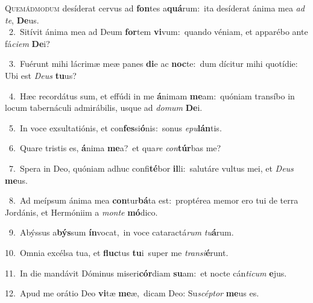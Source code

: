 \lettrine{\initial\textcolor{\initialcolor}{Q}}{uemádmodum} desíderat cervus ad \textbf{fon}\-tes a\-\textbf{quá}\-rum:~\star ita desíderat ánima mea \textit{ad} \textit{te}\-, \textbf{De}\-us.\\
{\numbfont\textcolor{\numbcolor}{~2.}}~Sitívit ánima mea ad Deum \textbf{for}\-tem \textbf{vi}\-vum:~\star quando véniam, et apparébo ante fá\-\textit{ci}\-\textit{em} \textbf{De}\-i?\par
{\numbfont\textcolor{\numbcolor}{~3.}}~Fuérunt mihi lácrimæ meæ panes \textbf{di}\-e ac \textbf{noc}\-te:~\star dum dícitur mihi quotídie: Ubi est \textit{De}\-\textit{us} \textbf{tu}\-us?\par
{\numbfont\textcolor{\numbcolor}{~4.}}~Hæc recordátus sum, et effúdi in me \textbf{á}\-nimam \textbf{me}\-am:~\star quóniam transíbo in locum tabernáculi admirábilis, usque ad \textit{do}\-\textit{mum} \textbf{De}\-i.\par
{\numbfont\textcolor{\numbcolor}{~5.}}~In voce exsultatiónis, et con\-\textbf{fes}\-si\-\textbf{ó}\-nis:~\star sonus \textit{e}\-\textit{pu}\textbf{lán}tis.\par
{\numbfont\textcolor{\numbcolor}{~6.}}~Quare tristis es, \textbf{á}\-nima \textbf{me}\-a?~\star et qua\textit{re} \textit{con}\-\textbf{túr}bas me?\par
{\numbfont\textcolor{\numbcolor}{~7.}}~Spera in Deo, quóniam adhuc confi\-\textbf{té}\-bor \textbf{il}\-li:~\star salutáre vultus mei, et \textit{De}\-\textit{us} \textbf{me}\-us.\par
{\numbfont\textcolor{\numbcolor}{~8.}}~Ad meípsum ánima mea \textbf{con}\-tur\-\textbf{bá}\-ta est:~\star proptérea memor ero tui de terra Jordánis, et Hermóniim a \textit{mon}\-\textit{te} \textbf{mó}\-dico.\par
{\numbfont\textcolor{\numbcolor}{~9.}}~Abýssus a\-\textbf{býs}\-sum \textbf{ín}\-vocat,~\star in voce cataractá\textit{rum} \textit{tu}\-\textbf{á}rum.\par
{\numbfont\textcolor{\numbcolor}{10.}}~Omnia excélsa tua, et \textbf{fluc}\-tus \textbf{tu}\-i~\star super me \textit{trans}\-\textit{i}\textbf{é}runt.\par
{\numbfont\textcolor{\numbcolor}{11.}}~In die mandávit Dóminus miseri\-\textbf{cór}\-diam \textbf{su}\-am:~\star et nocte cán\-\textit{ti}\-\textit{cum} \textbf{e}\-jus.\par
{\numbfont\textcolor{\numbcolor}{12.}}~Apud me orátio Deo \textbf{vi}\-tæ \textbf{me}\-æ,~\star dicam Deo: Su\-\textit{scép}\-\textit{tor} \textbf{me}\-us es.\par
